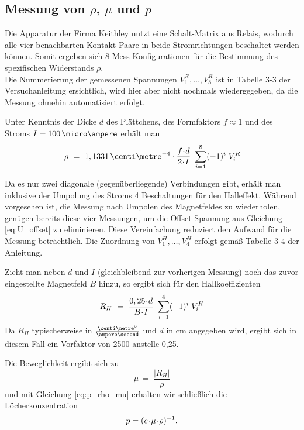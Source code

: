 \subsection{Messung von $\rho$, $\mu$ und $p$}

Die Apparatur der Firma Keithley nutzt eine Schalt-Matrix aus Relais, wodurch alle vier benachbarten Kontakt-Paare in beide Stromrichtungen beschaltet werden können. Somit ergeben sich 8 Mess-Konfigurationen für die Bestimmung des spezifischen Widerstands $\rho$.\\
Die Nummerierung der gemessenen Spannungen $V^R_1, \dots, V^R_8$ ist in Tabelle 3-3 der Versuchanleitung ersichtlich, wird hier aber nicht nochmals wiedergegeben, da die Messung ohnehin automatisiert erfolgt.

Unter Kenntnis der Dicke $d$ des Plättchens, des Formfaktors $f \approx 1$ und des Stroms  $I = 100\,\micro\ampere$ erhält man
\begin{equation}
\rho ~=~ 1,1331 \,\centi\metre^{-4} \cdot \frac{f \cdt d}{2 \cdt I} ~ \sum\limits_{i=1}^8 (-1)^i \; V^R_i
\end{equation}

Da es nur zwei \glqq diagonale\grqq{} (gegenüberliegende) Verbindungen gibt, erhält man inklusive der Umpolung des Stroms 4 Beschaltungen für den Halleffekt. Während vorgesehen ist, die Messung nach Umpolen des Magnetfeldes zu wiederholen, genügen bereits diese vier Messungen, um die Offset-Spannung aus Gleichung \eqref{eq:U_offset} zu eliminieren. Diese Vereinfachung reduziert den Aufwand für die Messung beträchtlich. Die Zuordnung von $V^H_1, \dots, V^H_4$ erfolgt gemäß Tabelle 3-4 der Anleitung.

Zieht man neben $d$ und $I$ (gleichbleibend zur vorherigen Messung) noch das zuvor eingestellte Magnetfeld $B$ hinzu, so ergibt sich für den Hallkoeffizienten 
\begin{equation}
R_H ~=~ \frac{0,25 \!\cdot\! d}{B \!\cdot\! I} ~ \sum\limits_{i=1}^4 (-1)^i \; V^H_i
\end{equation}
Da $R_H$ typischerweise in $\tfrac{\centi\metre^3}{\ampere\second}$ und $d$ in cm angegeben wird, ergibt sich in diesem Fall ein Vorfaktor von 2500 anstelle 0,25.

Die Beweglichkeit ergibt sich zu
\begin{equation}
\mu ~=~ \frac{|R_H|}{\rho}
\end{equation}
und mit Gleichung \eqref{eq:p_rho_mu} erhalten wir schließlich die Löcherkonzentration
\begin{equation}
p = (e \!\cdot\! \mu \!\cdot\! \rho)^{-1}.
\end{equation}

